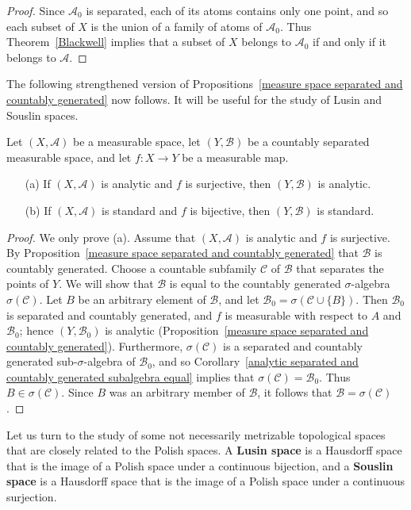 \begin{proof}
Since $\mathcal{A}_0$ is separated, each of its atoms contains only one point, and so each subset of $X$ is the union of a family of atoms of $\mathcal{A}_0$. Thus Theorem~\ref{Blackwell} implies that a subset of $X$ belongs to $\mathcal{A}_0$ if and only if it belongs to $\mathcal{A}$.
\end{proof}
The following strengthened version of Propositions~\ref{measure space separated and countably generated} now follows. It will be useful for the study of Lusin and Souslin spaces.
\begin{proposition}\label{measure space countably separated}
Let $(X,\mathcal{A})$ be a measurable space, let $(Y,\mathcal{B})$ be a countably separated measurable space, and let $f:X\to Y$ be a measurable map.
\begin{itemize}
\item[(a)] If $(X,\mathcal{A})$ is analytic and $f$ is surjective, then $(Y,\mathcal{B})$ is analytic.
\item[(b)] If $(X,\mathcal{A})$ is standard and $f$ is bijective, then $(Y,\mathcal{B})$ is standard.
\end{itemize}
\end{proposition}
\begin{proof}
We only prove (a). Assume that $(X,\mathcal{A})$ is analytic and $f$ is surjective. By Proposition~\ref{measure space separated and countably generated} that $\mathcal{B}$ is countably generated. Choose a countable subfamily $\mathcal{C}$ of $\mathcal{B}$ that separates the points of $Y$. We will show that $\mathcal{B}$ is equal to the countably generated $\sigma$-algebra $\sigma(\mathcal{C})$. Let $B$ be an arbitrary element of $\mathcal{B}$, and let $\mathcal{B}_0=\sigma(\mathcal{C}\cup\{B\})$. Then $\mathcal{B}_0$ is separated and countably generated, and $f$ is measurable with respect to $A$ and $\mathcal{B}_0$; hence $(Y,\mathcal{B}_0)$ is analytic (Proposition~\ref{measure space separated and countably generated}). Furthermore, $\sigma(\mathcal{C})$ is a separated and countably generated sub-$\sigma$-algebra of $\mathcal{B}_0$, and so Corollary~\ref{analytic separated and countably generated subalgebra equal} implies that $\sigma(\mathcal{C})=\mathcal{B}_0$. Thus $B\in\sigma(\mathcal{C})$. Since $B$ was an arbitrary member of $\mathcal{B}$, it follows that $\mathcal{B}=\sigma(\mathcal{C})$.
\end{proof}
Let us turn to the study of some not necessarily metrizable topological spaces that are closely related to the Polish spaces. A \textbf{Lusin space} is a Hausdorff space that is the image of a Polish space under a continuous bijection, and a \textbf{Souslin space} is a Hausdorff space that is the image of a Polish space under a continuous surjection.
